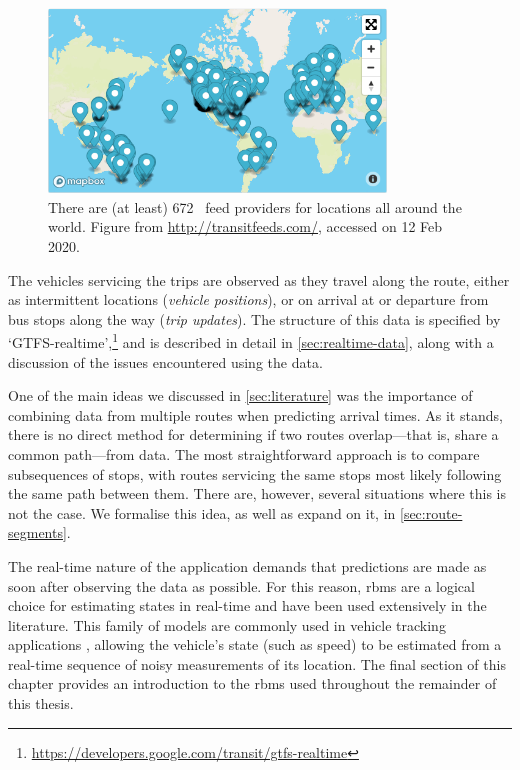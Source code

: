 \begin{figure}
\centering
\includegraphics[width=0.8\textwidth]{figure/gtfs_feeds.png}
\caption[Global distribution of GTFS feeds]{There are (at least) 672~\GTFS{} feed providers for locations all around the world.
Figure from \url{http://transitfeeds.com/}, accessed on 12 Feb 2020.}
\label{fig:gtfs_feeds}
\end{figure}


The vehicles servicing the trips are observed as they travel along the route, either as intermittent \GPS{} locations (\emph{vehicle positions}), or on arrival at or departure from bus stops along the way (\emph{trip updates}). The structure of this data is specified by `GTFS-realtime',\footnote{\url{https://developers.google.com/transit/gtfs-realtime}} and is described in detail in \cref{sec:realtime-data}, along with a discussion of the issues encountered using the \AT{} data.


One of the main ideas we discussed in \cref{sec:literature} was the importance of combining data from multiple routes when predicting arrival times. As it stands, there is no direct method for determining if two routes overlap---that is, share a common path---from \GTFS{} data. The most straightforward approach is to compare subsequences of stops, with routes servicing the same stops most likely following the same path between them. There are, however, several situations where this is not the case. We formalise this idea, as well as expand on it, in \cref{sec:route-segments}.


The real-time nature of the application demands that predictions are made as soon after observing the data as possible. For this reason, \glspl{rbm} are a logical choice for estimating states in real-time and have been used extensively in the literature. This family of models are commonly used in vehicle tracking applications \citep{Zhao_1997,Mutambara_2000,Carpenter_1999,Wall_1999}, allowing the vehicle's state (such as speed) to be estimated from a real-time sequence of noisy measurements of its location. The final section of this chapter provides an introduction to the \glspl{rbm} used throughout the remainder of this thesis.


